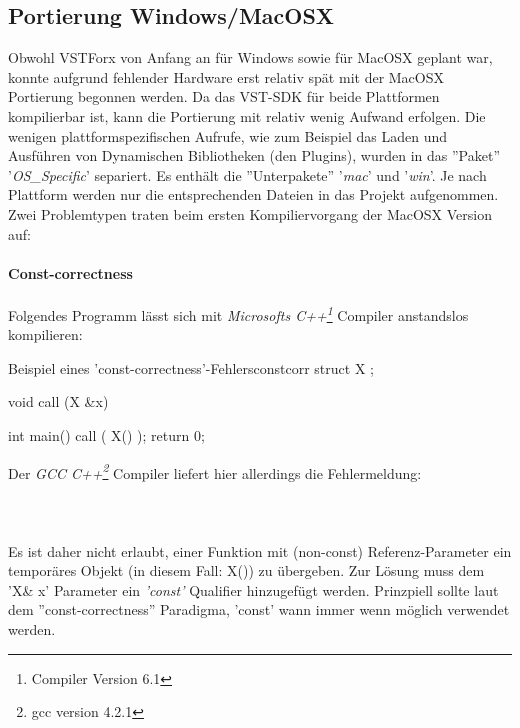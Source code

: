 \subsection{Portierung Windows/MacOSX}
Obwohl VSTForx von Anfang an für Windows sowie für MacOSX geplant war, konnte aufgrund fehlender Hardware erst relativ spät mit der MacOSX Portierung begonnen werden. Da das VST-SDK für beide Plattformen kompilierbar ist, kann die Portierung mit relativ wenig Aufwand erfolgen. Die wenigen plattformspezifischen Aufrufe, wie zum Beispiel das Laden und Ausführen von Dynamischen Bibliotheken (den Plugins), wurden in das ''Paket'' '\emph{OS\_Specific}' separiert. Es enthält die ''Unterpakete'' '\emph{mac}' und '\emph{win}'. Je nach Plattform werden nur die entsprechenden Dateien in das Projekt aufgenommen.  
\NP
Zwei Problemtypen traten beim ersten Kompiliervorgang der MacOSX Version auf:

\paragraph{Const-correctness} Folgendes Programm lässt sich mit \emph{Microsofts C++\footnote{Compiler Version 6.1}} Compiler anstandslos kompilieren:
\begin{code}{Beispiel eines 'const-correctness'-Fehlers}{constcorr}
struct X {
};

void call (X &x) {
}

int main() {
  call ( X() );
  return 0;
}
\end{code}
Der \emph{GCC C++\footnote{gcc version 4.2.1}} Compiler liefert hier allerdings die Fehlermeldung: 
\\\\
\\\\
Es ist daher nicht erlaubt, einer Funktion mit (non-const) Referenz-Parameter ein temporäres Objekt (in diesem Fall: X()) zu übergeben. Zur Lösung muss dem 'X\& x' Parameter ein \emph{'const'} Qualifier hinzugefügt werden. Prinzpiell sollte laut dem ''const-correctness'' Paradigma, 'const' wann immer wenn möglich verwendet werden.

